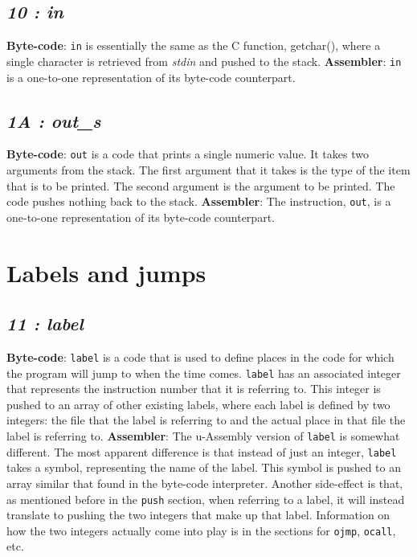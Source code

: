 \documentclass[12pt]{report}
\begin{document}
  \subsection{\emph{10 : in}}
  \textbf{Byte-code}: \verb|in| is essentially the same as the C function, getchar(),
  where a single character is retrieved from \emph{stdin} and pushed to the stack.
  \newline
  \textbf{Assembler}: \verb|in| is a one-to-one representation of its byte-code
  counterpart.
  \subsection{\emph{1A : out\_s}}
  \textbf{Byte-code}: \verb|out| is a code that prints a single numeric value.  It
  takes two arguments from the stack.  The first argument that it takes is the 
  type of the item that is to be printed.  The second argument is the argument 
  to be printed.  The code pushes nothing back to the stack.\newline
  \textbf{Assembler}: The instruction, \verb|out|, is a one-to-one representation of
  its byte-code counterpart.

  \section{Labels and jumps}
  \subsection{\emph{11 : label}}
  \textbf{Byte-code}: \verb|label| is a code that is used to define places in the code
  for which the program will jump to when the time comes.  \verb|label| has an
  associated integer that represents the instruction number that it is referring to.
  This integer is pushed to an array of other existing labels, where each label is
  defined by two integers: the file that the label is referring to and the actual
  place in that file the label is referring to.\newline
  \textbf{Assembler}: The u-Assembly version of \verb|label| is somewhat different.
  The most apparent difference is that instead of just an integer, \verb|label| takes
  a symbol, representing the name of the label.  This symbol is pushed to an array
  similar that found in the byte-code interpreter.  Another side-effect is that,
  as mentioned before in the \verb|push| section, when referring to a label, it
  will instead translate to pushing the two integers that make up that label.
  \newline
  Information on how the two integers actually come into play is in the sections for
  \verb|ojmp|, \verb|ocall|, etc.
\end{document}
